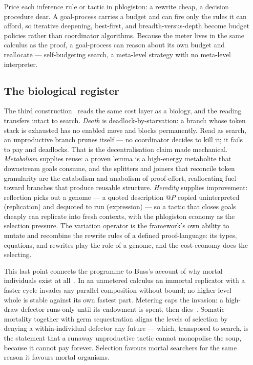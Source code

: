 \documentclass[11pt]{article}
\theoremstyle{definition}
\theoremstyle{plain}
\begin{document}
Price each inference rule or tactic in phlogiston: a rewrite cheap, a decision
procedure dear. A goal-process carries a budget and can fire only the rules it
can afford, so iterative deepening, best-first, and breadth-versus-depth become
budget policies rather than coordinator algorithms. Because the meter lives in
the same calculus as the proof, a goal-process can reason about its own budget
and reallocate --- self-budgeting search, a meta-level strategy with no
meta-level interpreter.

\subsection{The biological register}

The third construction~\cite{NoteIII} reads the same cost layer as a biology,
and the reading transfers intact to search. \emph{Death} is
deadlock-by-starvation: a branch whose token stack is exhausted has no enabled
move and blocks permanently. Read as search, an unproductive branch prunes
itself --- no coordinator decides to kill it; it fails to pay and deadlocks. That
is the decentralisation claim made mechanical. \emph{Metabolism} supplies reuse:
a proven lemma is a high-energy metabolite that downstream goals consume, and the
splitters and joiners that reconcile token granularity are the catabolism and
anabolism of proof-effort, reallocating fuel toward branches that produce
reusable structure. \emph{Heredity} supplies improvement: reflection picks out a
genome --- a quoted description $@P$ copied uninterpreted (replication) and
dequoted to run (expression) --- so a tactic that closes goals cheaply can
replicate into fresh contexts, with the phlogiston economy as the selection
pressure. The variation operator is the framework's own ability to mutate and
recombine the rewrite rules of a defined proof-language: its types, equations,
and rewrites play the role of a genome, and the cost economy does the selecting.

This last point connects the programme to Buss's account of why mortal
individuals exist at all~\cite{Buss87}. In an unmetered calculus an immortal
replicator with a faster cycle invades any parallel composition without bound;
no higher-level whole is stable against its own fastest part. Metering caps the
invasion: a high-draw defector runs only until its endowment is spent, then
dies~\cite{NoteIII}. Somatic mortality together with germ sequestration aligns
the levels of selection by denying a within-individual defector any future ---
which, transposed to search, is the statement that a runaway unproductive tactic
cannot monopolise the soup, because it cannot pay forever. Selection favours
mortal searchers for the same reason it favours mortal organisms.
\end{document}
